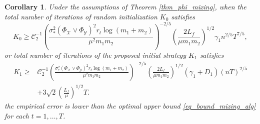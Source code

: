 \documentclass[12pt]{article}
\newtheorem{cor}{Corollary}
\begin{document}
 \begin{cor}
 \label{cor_iteration_step_mixing}
	Under the assumptions of Theorem \ref{thm_phi_mixing},
	when the total number of iterations of random initialization $K_0$ satisfies
	\begin{equation*}
		K_0 \ge \mathcal{C}_2^{-1}\left(\frac{\sigma_*^2(\Phi_\mathcal{X}\vee \Phi_\mathcal{Y})^2r_t\log(m_1+m_2)}{\mu^2m_1m_2}\right)^{-2/5} \left(\frac{2L_f}{\mu m_1m_2}\right)^{1/2}\gamma_1 n^{2/5}T^{7/5},
	\end{equation*}
	 or total number of iterations of the proposed initial strategy $K_1$ satisfies
	\begin{align*}
		K_1 \ge  &\mathcal{C}_2^{-1}\left(\frac{\sigma_*^2(\Phi_\mathcal{X}\vee \Phi_\mathcal{Y})^2r_t\log(m_1+m_2)}{\mu^2m_1m_2}\right)^{-2/5}\left(\frac{2L_f}{\mu m_1m_2}\right)^{1/2} (\gamma_1 +D_1) (nT)^{2/5}
         \\&+ 3\sqrt{2}\left(\frac{L_f}{\mu}\right)^{1/2}T.
	\end{align*}
      the empirical error is lower than the optimal upper bound \eqref{eq_bound_mixing_alg} for each $t=1,\ldots,T$.
   \end{cor}
\end{document}

